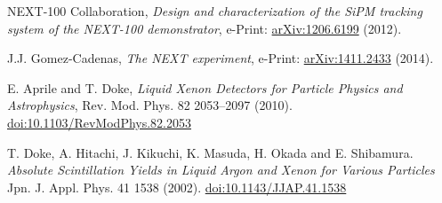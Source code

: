 \documentclass[12pt,a4paper,english,twoside]{article}
\begin{document}
\begin{thebibliography}{99}
NEXT-100 Collaboration, {\em Design and characterization of the SiPM tracking system of the NEXT-100 demonstrator}, e-Print: \href{http://arxiv.org/abs/1206.6199}{arXiv:1206.6199} (2012). 

J.J. Gomez-Cadenas, {\em The NEXT experiment}, e-Print: \href{http://arxiv.org/abs/1411.2433}{arXiv:1411.2433} (2014).

E. Aprile and T. Doke, {\em Liquid Xenon Detectors for Particle Physics and Astrophysics}, Rev. Mod. Phys. 82 2053–2097 (2010). \href{http://doi.org/10.1103/RevModPhys.82.2053}{doi:10.1103/RevModPhys.82.2053}

T. Doke, A. Hitachi, J. Kikuchi, K. Masuda, H. Okada and E. Shibamura. {\em Absolute Scintillation Yields in Liquid Argon and Xenon for Various Particles} Jpn. J. Appl. Phys. 41 1538 (2002). \href{http://dx.doi.org/10.1143/JJAP.41.1538}{doi:10.1143/JJAP.41.1538}

\end{thebibliography}
\end{document}
